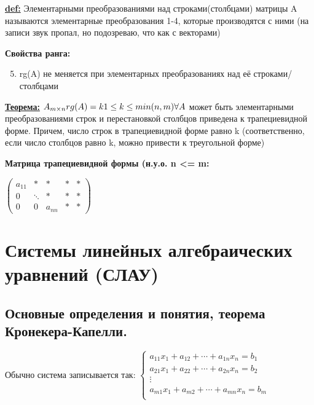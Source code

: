 \documentclass[twoside]{book}
\begin{document}
\textbf{\underline{def:}} Элементарными преобразованиями над строками(столбцами) матрицы A называются элементарные преобразования 1-4, которые производятся с ними (на записи звук пропал, но подозреваю, что как с векторами)

\textbf{Свойства ранга:}
\begin{enumerate}
    \setcounter{enumi}{4}
    \item rg(A) не меняется при элементарных преобразованиях над её строками/столбцами
\end{enumerate}

\textbf{\underline{Теорема:}}
\( A_{m \times n} \newline
rg(A) = k \newline
1 \leq k \leq min(n, m) \newline
\forall A\) может быть элементарными преобразованиями строк и перестановкой столбцов приведена к трапециевидной форме. Причем, число строк в трапециевидной форме равно k (соответственно, если число столбцов равно k, можно привести к треугольной форме)

\textbf{Матрица трапециевидной формы (н.у.о. n <= m:}

\(
\begin{pmatrix}
    a_{11} & *      & *      & * & * \\
    0      & \ddots & *      & * & * \\
    0      & 0      & a_{nn} & * & *
\end{pmatrix}
\) %

\section{Системы линейных алгебраических уравнений (СЛАУ)}
\subsection{Основные определения и понятия, теорема Кронекера-Капелли.}
Обычно система записывается так:
\(\begin{cases}
    a_{11}x_1 + a_{12} + \cdots + a_{1n} x_n = b_1 \\

    a_{21}x_1 + a_{22} + \cdots + a_{2n} x_n = b_2 \\

    \vdots                                         \\

    a_{m1}x_1 + a_{m2} + \cdots + a_{mn} x_n = b_m \\
\end{cases}\)
\end{document}
